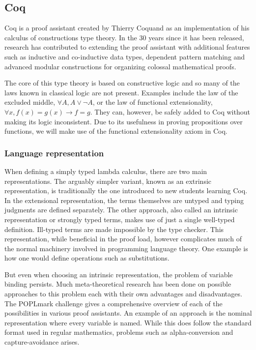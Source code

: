\documentclass[a4, 12pt, final]{article}
\begin{document}

\subsection{Coq}

Coq is a proof assistant created by Thierry Coquand as an implementation of his calculus of constructions type theory\cite{Coquand1988}. In the 30 years since it has been released, research has contributed to extending the proof assistant with additional features such as inductive and co-inductive data types\cite{Coquand1990}, dependent pattern matching\cite{Sozeau2010} and advanced modular constructions for organizing colossal mathematical proofs\cite{Sozeau2008}\cite{Mahboubi2013}.

The core of this type theory is based on constructive logic and so many of the laws known in classical logic are not present. Examples include the law of the excluded middle, $\forall A, A \vee \neg A$, or the law of functional extensionality, $\forall x, f(x) = g(x) \rightarrow f = g$. They can, however, be safely added to Coq without making its logic inconsistent. Due to its usefulness in proving propositions over functions, we will make use of the functional extensionality axiom in Coq.

\subsubsection{Language representation}

When defining a simply typed lambda calculus, there are two main representations. The arguably simpler variant, known as an extrinsic representation, is traditionally the one introduced to new students learning Coq. In the extensional representation, the terms themselves are untyped and typing judgments are defined separately. The other approach, also called an intrinsic representation or strongly typed terms, makes use of just a single well-typed definition. Ill-typed terms are made impossible by the type checker. This representation, while beneficial in the proof load, however complicates much of the normal machinery involved in programming language theory. One example is how one would define operations such as substitutions.

But even when choosing an intrinsic representation, the problem of variable binding persists. Much meta-theoretical research has been done on possible approaches to this problem each with their own advantages and disadvantages. The POPLmark challenge gives a comprehensive overview of each of the possibilities in various proof assistants\cite{Aydemir2005}. An example of an approach is the nominal representation where every variable is named. While this does follow the standard format used in regular mathematics, problems such as alpha-conversion and capture-avoidance arises.
\end{document}
